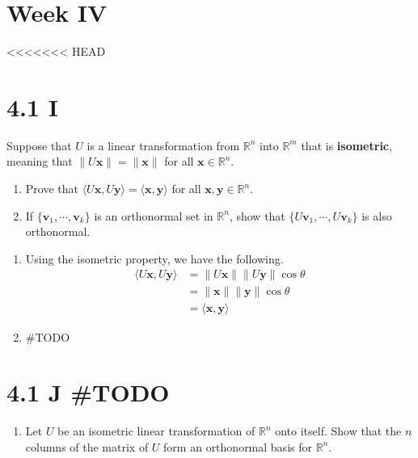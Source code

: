 \documentclass[../main.tex]{subfiles}
\begin{document}
\section{Week IV}

<<<<<<< HEAD
\section{4.1 I}
\begin{problem}
    Suppose that $U$ is a linear transformation from $\mathbb{R}^n$ into $\mathbb{R}^m$ that is \textbf{isometric}, meaning that $\|U \mathbf{x}\| = \|\mathbf{x}\|$ for all $\mathbf{x} \in \mathbb{R}^n$.
    \begin{enumerate}[label=(\alph*)]
        \item Prove that $\langle U\mathbf{x}, U \mathbf{y} \rangle = \langle \mathbf{x}, \mathbf{y} \rangle$ for all $\mathbf{x}, \mathbf{y} \in \mathbb{R}^n$.
        \item If $\{ \mathbf{v}_1, \cdots, \mathbf{v}_k \}$ is an orthonormal set in $\mathbb{R}^n$, show that $\{ U \mathbf{v}_1, \cdots, U \mathbf{v}_k \}$ is also orthonormal.
    \end{enumerate}
\end{problem}
\begin{enumerate}[label=(\alph*)]
    \item Using the isometric property, we have the following.
        \begin{align*}
            \langle U\mathbf{x}, U\mathbf{y} \rangle
            &= \|U\mathbf{x}\| \|U\mathbf{y}\| \cos\theta \\
            &= \|\mathbf{x}\| \|\mathbf{y}\| \cos\theta \\
            &= \langle \mathbf{x}, \mathbf{y} \rangle
        \end{align*}
    \item \#TODO
\end{enumerate}

\section{4.1 J \#TODO}
\begin{problem}
    \begin{enumerate}[label=(\alph*)]
        \item Let $U$ be an isometric linear transformation of $\mathbb{R}^n$ onto itself.
            Show that the $n$ columns of the matrix of $U$ form an orthonormal basis for $\mathbb{R}^n$.
    \end{enumerate}
\end{problem}
\end{document}
